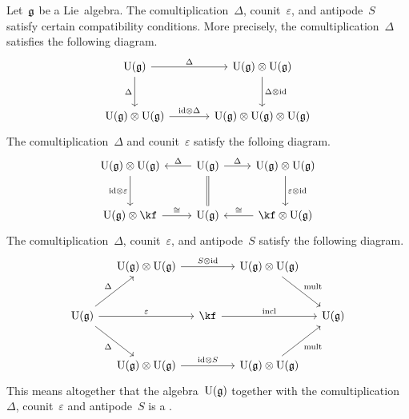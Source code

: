 \begin{remark}
	Let~$\mathfrak{g}$ be a Lie~algebra.
	The comultiplication~$\Delta$, counit~$\varepsilon$, and antipode~$S$ satisfy certain compatibility conditions.
	More precisely, the comultiplication~$\Delta$ satisfies the following  diagram.
	\[
		\begin{tikzcd}[sep = large]
			\Univ(\glie)
			\arrow{r}[above]{\Delta}
			\arrow{d}[left]{\Delta}
			&
			\Univ(\glie) \tensor \Univ(\glie)
			\arrow{d}[right]{\Delta \tensor \id}
			\\
			\Univ(\glie) \tensor \Univ(\glie)
			\arrow{r}[above]{\id \tensor \Delta}
			&
			\Univ(\glie) \tensor \Univ(\glie) \tensor \Univ(\glie)
		\end{tikzcd}
	\]
	The comultiplication~$\Delta$ and counit~$\varepsilon$ satisfy the folloing  diagram.
	\[
		\begin{tikzcd}[row sep = large]
			\Univ(\glie) \tensor \Univ(\glie)
			\arrow{d}[left]{\id \tensor \varepsilon}
			&
			\Univ(\glie)
			\arrow{l}[above]{\Delta}
			\arrow{r}[above]{\Delta}
			\arrow[equal]{d}
			&
			\Univ(\glie) \tensor \Univ(\glie)
			\arrow{d}[right]{\varepsilon \tensor \id}
			\\
			\Univ(\glie) \tensor \kf
			\arrow{r}[above]{\cong}
			&
			\Univ(\glie)
			&
			\kf \tensor \Univ(\glie)
			\arrow{l}[above]{\cong}
		\end{tikzcd}
	\]
	The comultiplication~$\Delta$, counit~$\varepsilon$, and antipode~$S$ satisfy the following  diagram.
	\[
		\begin{tikzcd}[column sep = small, row sep = large]
			{}
			&
			\Univ(\glie) \tensor \Univ(\glie)
			\arrow{rr}{S \tensor \id}
			&
			{}
			&
			\Univ(\glie) \tensor \Univ(\glie)
			\arrow{dr}{\mathrm{mult}}
			&
			{}
			\\
			\Univ(\glie)
			\arrow{ur}[above left]{\Delta}
			\arrow{rr}[above]{\varepsilon}
			\arrow{dr}[below left]{\Delta}
			&
			{}
			&
			\kf
			\arrow{rr}[above]{\mathrm{incl}}
			&
			{}
			&
			\Univ(\glie)
			\\
			{}
			&
			\Univ(\glie) \tensor \Univ(\glie)
			\arrow{rr}[above]{\id \tensor S}
			&
			{}
			&
			\Univ(\glie) \tensor \Univ(\glie)
			\arrow{ur}[below right]{\mathrm{mult}}
			&
			{}
		\end{tikzcd}
	\]
	This means altogether that the algebra~$\operatorname{U}(\mathfrak{g})$ together with the comultiplication~$\Delta$, counit~$\varepsilon$ and antipode~$S$ is a .
\end{remark}


